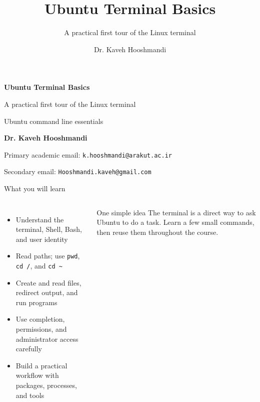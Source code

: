 \documentclass[aspectratio=169,10pt]{beamer}
\title{Ubuntu Terminal Basics}
\subtitle{A practical first tour of the Linux terminal}
\author{Dr. Kaveh Hooshmandi}
\date{}
\newcommand{\term}[1]{\texttt{#1}}
\begin{document}
\begin{frame}[plain]
  \vspace{1.3cm}
  {\color{white}\Huge\bfseries Ubuntu Terminal Basics\par}
  \vspace{0.35cm}
  {\color{white!78}\Large A practical first tour of the Linux terminal\par}
  \vspace{0.6cm}
  {\color{white!65}\normalsize Ubuntu command line essentials\par}
  \vspace{0.65cm}
  {\color{white}\large\bfseries Dr. Kaveh Hooshmandi\par}
  \vspace{0.12cm}
  {\color{white!85}\small Primary academic email: \texttt{k.hooshmandi@arakut.ac.ir}\par}
  {\color{white!70}\small Secondary email: \texttt{Hooshmandi.kaveh@gmail.com}\par}
\end{frame}

\begin{frame}{What you will learn}
  \begin{columns}[T,onlytextwidth]
      \begin{itemize}
        \item Understand the terminal, Shell, Bash, and user identity
        \item Read paths; use \term{pwd}, \term{cd /}, and \term{cd \textasciitilde{}}
        \item Create and read files, redirect output, and run programs
        \item Use completion, permissions, and administrator access carefully
        \item Build a practical workflow with packages, processes, and tools
      \end{itemize}
      \begin{block}{One simple idea}
        The terminal is a direct way to ask Ubuntu to do a task. Learn a few small commands, then reuse them throughout the course.
      \end{block}
  \end{columns}
\end{frame}
\end{document}
